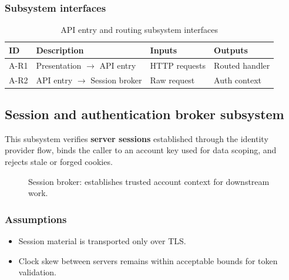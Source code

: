 \subsubsection{Subsystem interfaces}
\begin{table}[H]
\centering
\small
\begin{tabular}{|p{0.9cm}|p{3.4cm}|p{3.0cm}|p{3.5cm}|}
\hline
\textbf{ID} & \textbf{Description} & \textbf{Inputs} & \textbf{Outputs} \\
\hline
A-R1 & Presentation $\rightarrow$ API entry & HTTP requests & Routed handler \\
\hline
A-R2 & API entry $\rightarrow$ Session broker & Raw request & Auth context \\
\hline
\end{tabular}
\caption{API entry and routing subsystem interfaces}
\end{table}

\subsection{Session and authentication broker subsystem}

This subsystem verifies \textbf{server sessions} established through the identity provider flow, binds the caller to an account key used for data scoping, and rejects stale or forged cookies.

\begin{figure}[H]
\centering
{}
\caption{Session broker: establishes trusted account context for downstream work.}
\label{fig:app-session}
\end{figure}

\subsubsection{Assumptions}
\begin{itemize}
  \item Session material is transported only over TLS.
  \item Clock skew between servers remains within acceptable bounds for token validation.
\end{itemize}

